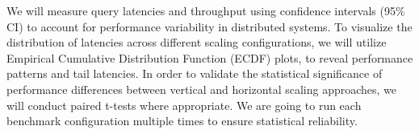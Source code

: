 \documentclass{article}
\begin{document}
We will measure query latencies and throughput using confidence
intervals (95\% CI) to account for performance variability in distributed
systems. 
%
To visualize the distribution of latencies across different scaling
configurations, we will utilize Empirical Cumulative Distribution Function
(ECDF) plots, to reveal performance patterns and tail latencies.
%
In order to validate the statistical significance of performance differences
between vertical and horizontal scaling approaches, we will conduct paired
t-tests where appropriate.
%
We are going to run each benchmark configuration multiple times to ensure statistical
reliability.
\end{document}
